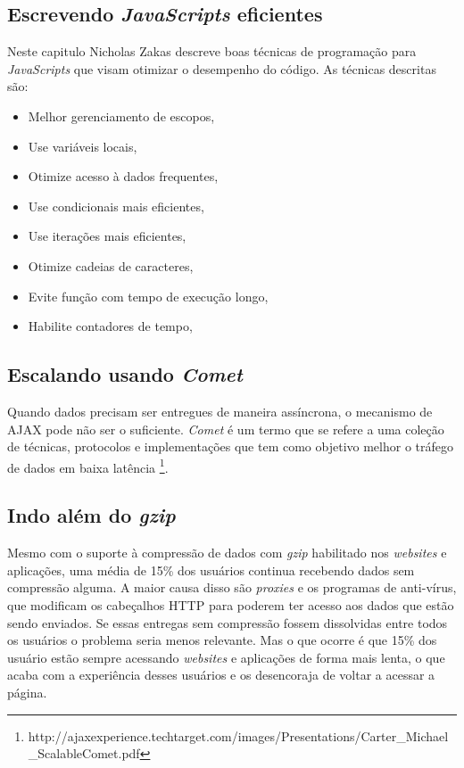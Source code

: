 \subsection{Escrevendo \textit{JavaScripts} eficientes}
\label{subsec:evenfaster_cap7}
Neste capitulo Nicholas Zakas descreve boas técnicas de programação para \textit{JavaScripts} que visam otimizar o desempenho do código. As técnicas descritas são:

\begin{itemize}
	\item Melhor gerenciamento de escopos, \cite[p.79]{EvenFaster}
	\item Use variáveis locais, \cite[p.~81]{EvenFaster}
	\item Otimize acesso à dados frequentes, \cite[p.~85]{EvenFaster}
	\item Use condicionais mais eficientes, \cite[p.~89]{EvenFaster}
	\item Use iterações mais eficientes, \cite[p.~93]{EvenFaster}
	\item Otimize cadeias de caracteres, \cite[p.~99]{EvenFaster}
	\item Evite função com tempo de execução longo, \cite[p.~102]{EvenFaster}
	\item Habilite contadores de tempo, \cite[p.~103]{EvenFaster}
\end{itemize}

\subsection{Escalando usando \textit{Comet}}
\label{subsec:evenfaster_cap8}
Quando dados precisam ser entregues de maneira assíncrona, o mecanismo de AJAX pode não ser o suficiente. \textit{Comet} é um termo que se refere a uma coleção de técnicas, protocolos e implementações que tem como objetivo melhor o tráfego de dados em baixa latência \footnote{http://ajaxexperience.techtarget.com/images/Presentations/Carter\_Michael\_ScalableComet.pdf}.

\subsection{Indo além do \textit{gzip}}
\label{subsec:evenfaster_cap9}
Mesmo com o suporte à compressão de dados com \textit{gzip} habilitado nos \textit{websites} e aplicações, uma média de 15\% dos usuários continua recebendo dados sem compressão alguma. A maior causa disso são \textit{proxies} e os programas de anti-vírus, que modificam os cabeçalhos HTTP para poderem ter acesso aos dados que estão sendo enviados. Se essas entregas sem compressão fossem dissolvidas entre todos os usuários o problema seria menos relevante. Mas o que ocorre é que 15\% dos usuário estão sempre acessando \textit{websites} e aplicações de forma mais lenta, o que acaba com a experiência desses usuários e os desencoraja de voltar a acessar a página.

